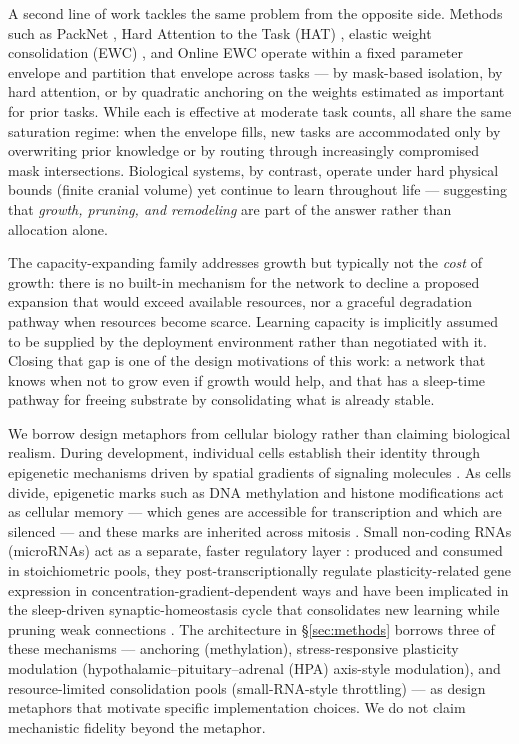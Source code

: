 \documentclass[11pt]{article}
\begin{document}
A second line of work tackles the same problem from the opposite side.
Methods such as PackNet \citep{mallya2018packnet}, Hard Attention to
the Task (HAT) \citep{serra2018hat}, elastic weight consolidation
(EWC) \citep{kirkpatrick2017overcoming}, and Online EWC
\citep{schwarz2018progress} operate within a fixed parameter envelope
and partition that envelope across tasks --- by mask-based isolation, by
hard attention, or by quadratic anchoring on the weights estimated as
important for prior tasks. While each is effective at moderate task
counts, all share the same saturation regime: when the envelope fills,
new tasks are accommodated only by overwriting prior knowledge or by
routing through increasingly compromised mask intersections. Biological
systems, by contrast, operate under hard physical bounds (finite cranial
volume) yet continue to learn throughout life --- suggesting that
\emph{growth, pruning, and remodeling} are part of the answer rather
than allocation alone.

The capacity-expanding family addresses growth but typically not the
\emph{cost} of growth: there is no built-in mechanism for the network to
decline a proposed expansion that would exceed available resources, nor a
graceful degradation pathway when resources become scarce. Learning
capacity is implicitly assumed to be supplied by the deployment
environment rather than negotiated with it. Closing that gap is one of
the design motivations of this work: a network that knows when not to
grow even if growth would help, and that has a sleep-time pathway for
freeing substrate by consolidating what is already stable.

We borrow design metaphors from cellular biology rather than claiming
biological realism. During development, individual cells establish their
identity through epigenetic mechanisms driven by spatial gradients of
signaling molecules \citep{wolpert1969positional}. As cells divide,
epigenetic marks such as DNA methylation \citep{smith2013dna} and histone
modifications \citep{bannister2011histone} act as cellular memory ---
which genes are accessible for transcription and which are silenced ---
and these marks are inherited across mitosis \citep{allis2016hallmarks}.
Small non-coding RNAs (microRNAs) act as a separate, faster regulatory
layer \citep{bartel2009micrornas}: produced and consumed in stoichiometric
pools, they post-transcriptionally regulate plasticity-related gene
expression in concentration-gradient-dependent ways
\citep{schratt2009micrornas} and have been implicated in the sleep-driven
synaptic-homeostasis cycle that consolidates new learning while pruning
weak connections \citep{tononi2014sleep}. The architecture in
\S\ref{sec:methods} borrows three of these mechanisms --- anchoring
(methylation), stress-responsive plasticity modulation
(hypothalamic--pituitary--adrenal (HPA) axis-style modulation), and
resource-limited consolidation pools (small-RNA-style throttling)
--- as design metaphors that motivate specific implementation
choices. We do not claim mechanistic fidelity beyond the metaphor.
\end{document}
